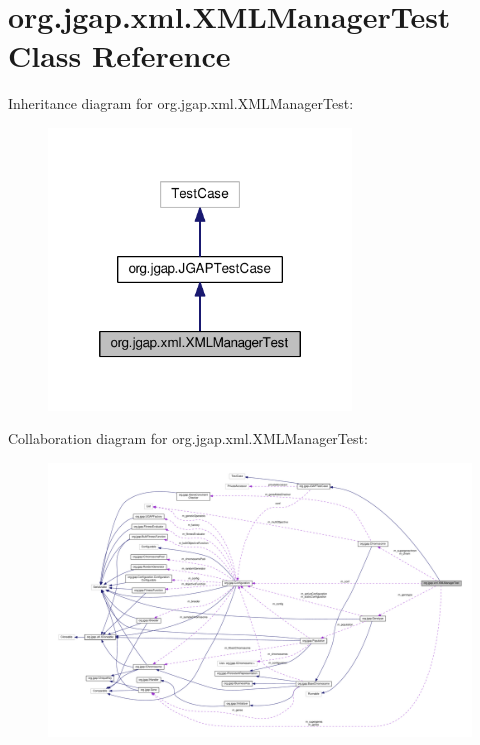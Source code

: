 \hypertarget{classorg_1_1jgap_1_1xml_1_1_x_m_l_manager_test}{\section{org.\-jgap.\-xml.\-X\-M\-L\-Manager\-Test Class Reference}
\label{classorg_1_1jgap_1_1xml_1_1_x_m_l_manager_test}
}


Inheritance diagram for org.\-jgap.\-xml.\-X\-M\-L\-Manager\-Test\-:
\nopagebreak
\begin{figure}[H]
\begin{center}
\leavevmode
\includegraphics[width=228pt]{classorg_1_1jgap_1_1xml_1_1_x_m_l_manager_test__inherit__graph}
\end{center}
\end{figure}


Collaboration diagram for org.\-jgap.\-xml.\-X\-M\-L\-Manager\-Test\-:
\nopagebreak
\begin{figure}[H]
\begin{center}
\leavevmode
\includegraphics[width=350pt]{classorg_1_1jgap_1_1xml_1_1_x_m_l_manager_test__coll__graph}
\end{center}
\end{figure}

